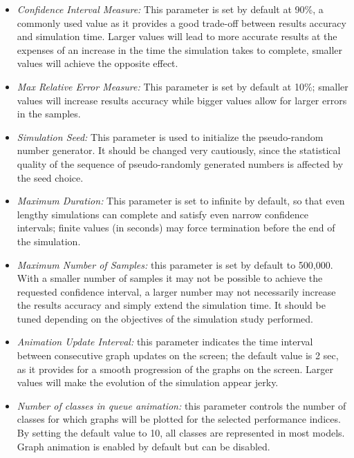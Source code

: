 \begin{itemize}
\item \emph{Confidence Interval Measure:} This parameter is set by
default at 90\%, a commonly used value as it provides a good
trade-off between results accuracy and simulation time. Larger
values will lead to more accurate results at the expenses of an
increase in the time the simulation takes to complete, smaller
values will achieve the opposite effect. \item  \emph{Max Relative
Error Measure:} This parameter is set by default at 10\%; smaller
values will increase results accuracy while bigger values allow
for larger errors in the samples. \item \emph{Simulation Seed:}
This parameter is used to initialize the pseudo-random number
generator. It should be changed very cautiously, since the
statistical quality of the sequence of pseudo-randomly generated
numbers is affected by the seed choice. \item \emph{Maximum
Duration:} This parameter is set to infinite by default, so that
even lengthy simulations can complete and satisfy even narrow
confidence intervals; finite values (in seconds) may force
termination before the end of the simulation. \item \emph{Maximum
Number of Samples:} this parameter is set by default to 500,000.
With a smaller number of samples it may not be possible to achieve
the requested confidence interval, a larger number may not
necessarily increase the results accuracy and simply extend the
simulation time. It should be tuned depending on the objectives of
the simulation study performed. \item \emph{Animation Update
Interval:} this parameter indicates the time interval between
consecutive graph updates on the screen; the default value is 2
sec, as it provides for a smooth progression of the graphs on the
screen. Larger values will make the evolution of the simulation
appear jerky. \item \emph{Number of classes in queue animation:}
this parameter controls the number of classes for which graphs
will be plotted for the selected performance indices. By setting
the default value to 10, all classes are represented in most
models. Graph animation is enabled by default but can be disabled.
\end{itemize}

